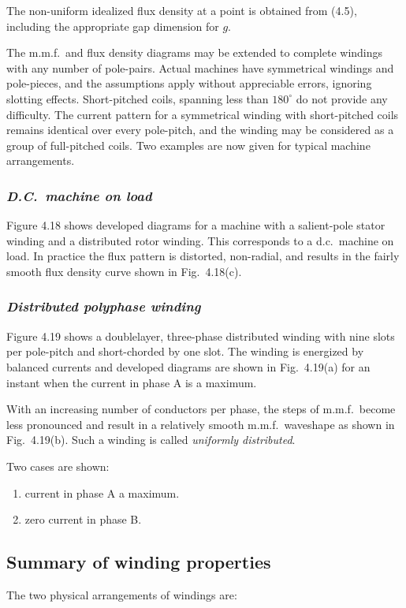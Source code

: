 \documentclass[a4paper,numbers=noenddot,12pt]{scrbook}
\begin{document}
The non-uniform idealized flux density at a point is obtained from (4.5), including the appropriate gap dimension for $g$. 

The m.m.f.\ and flux density diagrams may be extended to complete windings with any number of pole-pairs. Actual machines have symmetrical windings and pole-pieces, and the assumptions apply without appreciable errors, ignoring slotting effects. Short-pitched coils, spanning less than $180^{\circ}$ do not provide any difficulty. The current pattern for a symmetrical winding with short-pitched coils remains identical over every pole-pitch, and the winding may be considered as a group of full-pitched coils.
Two examples are now given for typical machine arrangements.

\subsubsection{\textit{D.C.\ machine on load}}
Figure 4.18 shows developed diagrams for a machine with a salient-pole stator winding and a distributed rotor winding. This corresponds to a d.c.\ machine on load. In practice the flux pattern is distorted, non-radial, and results in the fairly smooth flux density curve shown in Fig.\ 4.18(c). 

\subsubsection{\textit{Distributed polyphase winding}}
Figure 4.19 shows a double­layer, three-phase distributed winding with nine slots per pole-pitch and short-chorded by one slot. The winding is energized by balanced currents and developed diagrams are shown in Fig.\ 4.19(a) for an instant when the current in phase A is a maximum. 

With an increasing number of conductors per phase, the steps of m.m.f.\ become less pronounced and result in a relatively smooth m.m.f.\ waveshape as shown in Fig.\ 4.19(b). Such a winding is called \textit{uniformly distributed}.

Two cases are shown:
\begin{enumerate}
    \item current in phase A a maximum.
    \item zero current in phase B.
\end{enumerate}

\subsection{Summary of winding properties}
The two physical arrangements of windings are:
\end{document}
